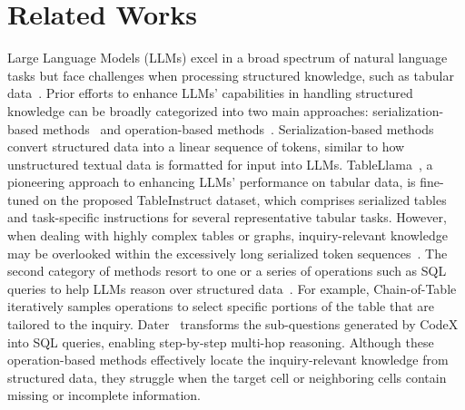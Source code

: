 \vspace{-0.05in}
\section{Related Works}
Large Language Models (LLMs) excel in a broad spectrum of natural language tasks but face challenges when processing structured knowledge, such as tabular data~\cite{zhao-etal-2023-investigating}. Prior efforts to enhance LLMs' capabilities in handling structured knowledge can be broadly categorized into two main approaches: serialization-based methods~\cite{min2024exploring,hegselmann2023tabllm,jaitly2023towards} and operation-based methods~\cite{li2023sheetcopilot,ye2023decomposers,jiang-etal-2023-structgpt,wang2024chainoftable,lu2023chameleon}. 
Serialization-based methods convert structured data into a linear sequence of tokens, similar to how unstructured textual data is formatted for input into LLMs. TableLlama~\cite{zhang2024tablellama}, a pioneering approach to enhancing LLMs' performance on tabular data, is fine-tuned on the proposed TableInstruct dataset, which comprises serialized tables and task-specific instructions for several representative tabular tasks. %
However, when dealing with highly complex tables or graphs, inquiry-relevant knowledge may be overlooked within the excessively long serialized token sequences~\cite{zhang2023ho,li2024snapkv}. 
The second category of methods resort to one or a series of operations such as SQL queries to help LLMs reason over structured data~\cite{li2023sheetcopilot,ye2023decomposers,jiang-etal-2023-structgpt,wang2024chainoftable,lu2023chameleon}. For example, Chain-of-Table~\cite{wang2024chainoftable} iteratively samples operations to select specific portions of the table that are tailored to the inquiry. Dater~\cite{ye2023decomposers} transforms the sub-questions generated by CodeX~\cite{chen2021evaluating} into SQL queries, enabling step-by-step multi-hop reasoning. Although these operation-based methods effectively locate the inquiry-relevant knowledge from structured data, they struggle when the target cell or neighboring cells contain missing or incomplete information.

